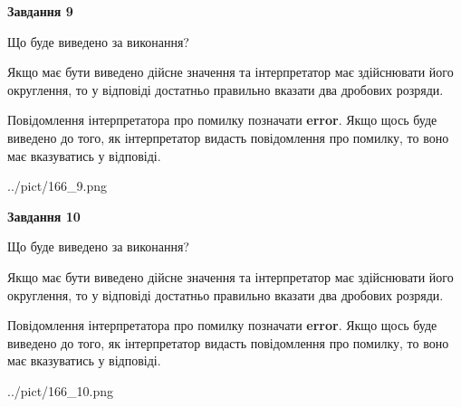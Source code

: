 \documentclass[12pt, ukrainian]{article}
\begin{document}
{\begin {Large}
{\begin {center}\textbf{Завдання 9}\end {center}}\par
Що буде виведено за виконання? \par

Якщо має бути виведено дійсне значення та інтерпретатор має здійснювати його округлення, 
то у відповіді достатньо правильно вказати два дробових розряди.

Повідомлення інтерпретатора про помилку позначати \textbf{error}.
Якщо щось буде виведено до того, як інтерпретатор видасть повідомлення про помилку, 
то воно має вказуватись у відповіді. \par

\begin{center}
	{../pict/166_9.png}
\end{center}
\newpage

{\begin {center}\textbf{Завдання 10}\end {center}}\par
Що буде виведено за виконання? \par

Якщо має бути виведено дійсне значення та інтерпретатор має здійснювати його округлення, 
то у відповіді достатньо правильно вказати два дробових розряди.

Повідомлення інтерпретатора про помилку позначати \textbf{error}.
Якщо щось буде виведено до того, як інтерпретатор видасть повідомлення про помилку, 
то воно має вказуватись у відповіді. \par

\begin{center}
	{../pict/166_10.png}
\end{center}
\newpage

\end {Large}}
\end{document}
